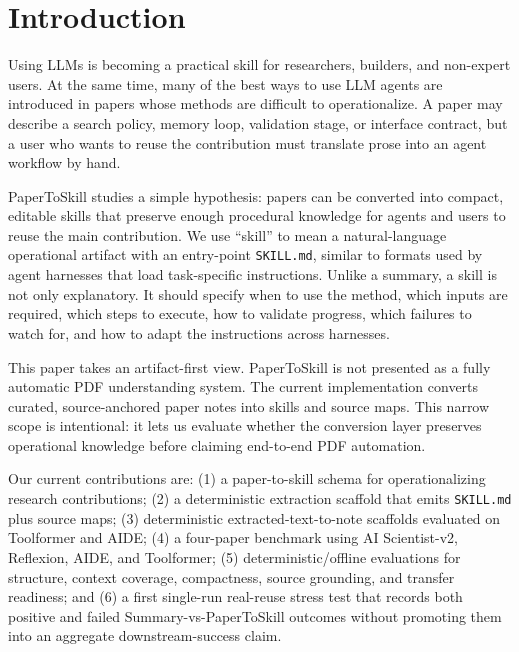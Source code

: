 \section{Introduction}

Using LLMs is becoming a practical skill for researchers, builders, and
non-expert users. At the same time, many of the best ways to use LLM agents are
introduced in papers whose methods are difficult to operationalize. A paper may
describe a search policy, memory loop, validation stage, or interface contract,
but a user who wants to reuse the contribution must translate prose into an
agent workflow by hand.

PaperToSkill studies a simple hypothesis: papers can be converted into compact,
editable skills that preserve enough procedural knowledge for agents and users
to reuse the main contribution. We use ``skill'' to mean a natural-language
operational artifact with an entry-point \texttt{SKILL.md}, similar to formats
used by agent harnesses that load task-specific instructions. Unlike a summary,
a skill is not only explanatory. It should specify when to use the method,
which inputs are required, which steps to execute, how to validate progress,
which failures to watch for, and how to adapt the instructions across
harnesses.

This paper takes an artifact-first view. PaperToSkill is not presented as a
fully automatic PDF understanding system. The current implementation converts
curated, source-anchored paper notes into skills and source maps. This narrow
scope is intentional: it lets us evaluate whether the conversion layer
preserves operational knowledge before claiming end-to-end PDF automation.

Our current contributions are: (1) a paper-to-skill schema for operationalizing
research contributions; (2) a deterministic extraction scaffold that emits
\texttt{SKILL.md} plus source maps; (3) deterministic extracted-text-to-note
scaffolds evaluated on Toolformer and AIDE; (4) a four-paper benchmark using AI
Scientist-v2, Reflexion, AIDE, and Toolformer; (5) deterministic/offline
evaluations for structure, context coverage, compactness, source grounding, and
transfer readiness; and (6) a first single-run real-reuse stress test that
records both positive and failed Summary-vs-PaperToSkill outcomes without
promoting them into an aggregate downstream-success claim.
